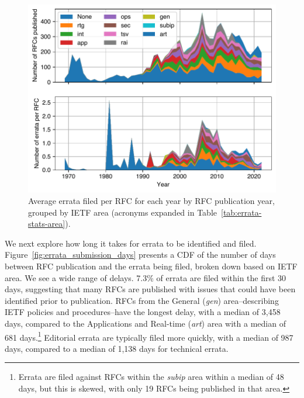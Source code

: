 \documentclass[twocolumn,10pt]{article}
\newlength{\figureWidthOneColumn}
\newcommand{\pb}[1]{\vspace{0.75ex}\noindent{\textbf{#1}}}
\begin{document}
\begin{figure}
  \centering
  \includegraphics[width=\figureWidthOneColumn]{figures-prev/tma-2023/errata-by-year.pdf}
  \caption{
    Average errata filed per RFC for each year by RFC publication year,
    grouped by IETF area (acronyms expanded in Table~\ref{tab:errata-stats-area}).
  }
  \label{fig:errata_per_year}
\end{figure}




\pb{Errata Delay:}
We next explore how long it takes for errata to be identified and filed.
Figure~\ref{fig:errata_submission_days} presents a CDF of the number of
days between RFC publication and the errata being filed, broken down based
on IETF area. We see a wide range of delays. 7.3\% of errata are filed
within the first 30 days, suggesting that many RFCs are published with
issues that could have been identified prior to publication.  RFCs from the
General (\emph{gen}) area--describing IETF policies and procedures--have
the longest delay, with a median of 3,458 days, compared to the
Applications and Real-time (\emph{art}) area with a median of 681
days.\footnote{Errata are filed against RFCs within the \emph{subip} area
within a median of 48 days, but this is skewed, with only 19 RFCs being
published in that area.} Editorial errata are typically filed more quickly,
with a median of 987 days, compared to a median of 1,138 days for technical
errata. 
\end{document}
